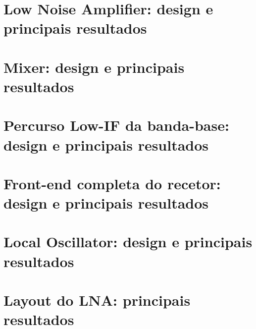 \section{Low Noise Amplifier: design e principais resultados}
\label{sec:lna-report}

\section{Mixer: design e principais resultados}
\label{sec:mixer-report}

\section{Percurso Low-IF da banda-base: design e principais resultados}
\label{sec:lowif-report}

\section{Front-end completa do recetor: design e principais resultados}
\label{sec:rxfe-report}

\section{Local Oscillator: design e principais resultados}
\label{sec:lo-report}

\section{Layout do LNA: principais resultados}
\label{sec:layout-report}
 



